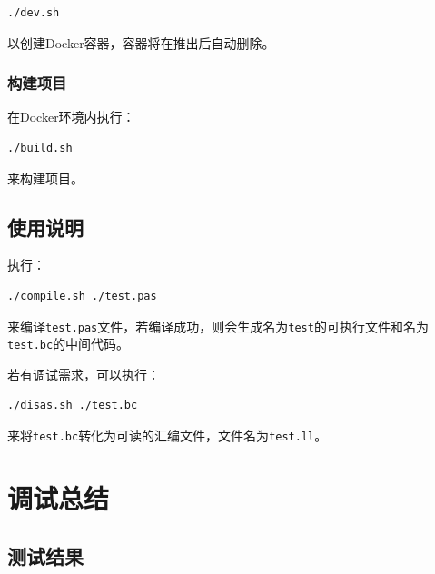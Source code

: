 \documentclass[lang=cn,11pt,a4paper,cite=authornum]{paper}
\begin{document}
\begin{code}
    \begin{verbatim}
./dev.sh
\end{verbatim}
\end{code}

以创建Docker容器，容器将在推出后自动删除。

\subsubsection{构建项目}

在Docker环境内执行：

\begin{code}
    \begin{verbatim}
./build.sh
\end{verbatim}
\end{code}

来构建项目。

\subsection{使用说明}

执行：

\begin{code}
    \begin{verbatim}
./compile.sh ./test.pas
\end{verbatim}
\end{code}

来编译\texttt{test.pas}文件，若编译成功，则会生成名为\texttt{test}的可执行文件和名为\texttt{test.bc}的中间代码。

若有调试需求，可以执行：

\begin{code}
    \begin{verbatim}
./disas.sh ./test.bc
\end{verbatim}
\end{code}

来将\texttt{test.bc}转化为可读的汇编文件，文件名为\texttt{test.ll}。

\section{调试总结}

\subsection{测试结果}
\end{document}
